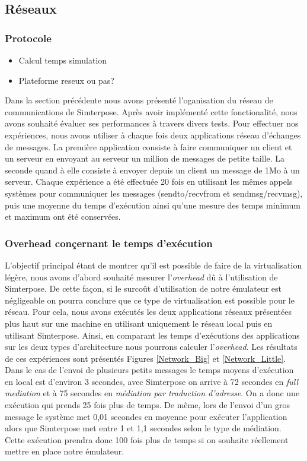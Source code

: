 \subsection{Réseaux}
\label{subsection:res}
\subsubsection{Protocole}
\begin{itemize}
  \item Calcul temps simulation
  \item Plateforme reseux ou pas?
\end{itemize}

Dans la section précédente nous avons présenté l'oganisation du réseau de communications de Simterpose. Après avoir implémenté cette fonctionalité, nous avons souhaité évaluer ses performances à travers divers tests. Pour effectuer nos expériences, nous avons utiliser à chaque fois deux applications réseau d'échanges de messages. La première application consiste à faire communiquer un client et un serveur en envoyant au serveur un million de messages de petite taille. La seconde quand à elle consiste à envoyer depuis un client un message de 1Mo à un serveur. Chaque expérience a été effectuée 20 fois en utilisant les mêmes appels systèmes pour communiquer les messages ({\color{red}sendto/recvfrom et sendmsg/recvmsg}), puis une moyenne du temps d'exécution ainsi qu'une mesure des temps minimum et maximum ont été conservées.

\subsubsection{Overhead conçernant le temps d'exécution}
L'objectif principal étant de montrer qu'il est possible de faire de la virtualisation légère, nous avons d'abord souhaité mesurer l'\textit{overhead} dû à l'utilisation de Simterpose. De cette façon, si le surcoût d'utilisation de notre émulateur est négligeable on pourra conclure que ce type de virtualisation est possible pour le réseau. Pour cela, nous avons exécutés les deux applications réseaux présentées plus haut sur une machine en utilisant uniquement le réseau local puis en utilisant Simterpose. Ainsi, en comparant les temps d'exécutions des applications sur les deux types d'architecture nous pourrons calculer l'\textit{overhead}. Les résultats de ces expériences sont présentés Figures \ref{Network_Big} et \ref{Network_Little}. Dans le cas de l'envoi de plusieurs petits messages le temps moyens d'exécution en local est d'environ 3 secondes, avec Simterpose on arrive à 72 secondes en \textit{full mediation} et à 75 secondes en \textit{médiation par traduction d'adresse}. On a donc une exécution qui prends 25 fois plus de temps. De même, lors de l'envoi d'un gros message le système met 0,01 secondes en moyenne pour exécuter l'application alors que Simterpose met entre 1 et 1,1 secondes selon le type de médiation. Cette exécution prendra donc 100 fois plus de temps si on souhaite réellement mettre en place notre émulateur.

